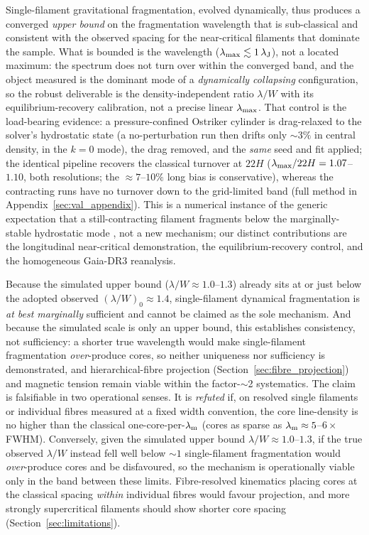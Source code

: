 \documentclass[usenatbib,twoside,twocolumn]{mnras}
\begin{document}
Single-filament gravitational fragmentation, evolved dynamically, thus produces a converged \emph{upper bound} on the fragmentation wavelength that is sub-classical and consistent with the observed spacing for the near-critical filaments that dominate the sample. What is bounded is the wavelength ($\lambda_{\rm max}\lesssim1\,\lambda_{\rm J}$), not a located maximum: the spectrum does not turn over within the converged band, and the object measured is the dominant mode of a \emph{dynamically collapsing} configuration, so the robust deliverable is the density-independent ratio $\lambda/W$ with its equilibrium-recovery calibration, not a precise linear $\lambda_{\rm max}$. That control is the load-bearing evidence: a pressure-confined Ostriker cylinder is drag-relaxed to the solver's hydrostatic state (a no-perturbation run then drifts only $\sim3\%$ in central density, in the $k=0$ mode), the drag removed, and the \emph{same} seed and fit applied; the identical pipeline recovers the classical turnover at $22H$ ($\lambda_{\rm max}/22H=1.07$--$1.10$, both resolutions; the $\approx7$--$10\%$ long bias is conservative), whereas the contracting runs have no turnover down to the grid-limited band (full method in Appendix~\ref{sec:val_appendix}). This is a numerical instance of the generic expectation that a still-contracting filament fragments below the marginally-stable hydrostatic mode \citep{Clarke2016,Clarke2017,Clarke2020}, not a new mechanism; our distinct contributions are the longitudinal near-critical demonstration, the equilibrium-recovery control, and the homogeneous Gaia-DR3 reanalysis.

Because the simulated upper bound ($\lambda/W\approx1.0$--$1.3$) already sits at or just below the adopted observed $(\lambda/W)_0\approx1.4$, single-filament dynamical fragmentation is \emph{at best marginally} sufficient and cannot be claimed as the sole mechanism. And because the simulated scale is only an upper bound, this establishes consistency, not sufficiency: a shorter true wavelength would make single-filament fragmentation \emph{over}-produce cores, so neither uniqueness nor sufficiency is demonstrated, and hierarchical-fibre projection (Section~\ref{sec:fibre_projection}) and magnetic tension remain viable within the factor-$\sim$2 systematics. The claim is falsifiable in two operational senses. It is \emph{refuted} if, on resolved single filaments or individual fibres measured at a fixed width convention, the core line-density is no higher than the classical one-core-per-$\lambda_{\rm m}$ (cores as sparse as $\lambda_{\rm m}\approx5$--$6\times$FWHM). Conversely, given the simulated upper bound $\lambda/W\approx1.0$--$1.3$, if the true observed $\lambda/W$ instead fell well below $\sim1$ single-filament fragmentation would \emph{over}-produce cores and be disfavoured, so the mechanism is operationally viable only in the band between these limits. Fibre-resolved kinematics placing cores at the classical spacing \emph{within} individual fibres would favour projection, and more strongly supercritical filaments should show shorter core spacing (Section~\ref{sec:limitations}).
\end{document}
